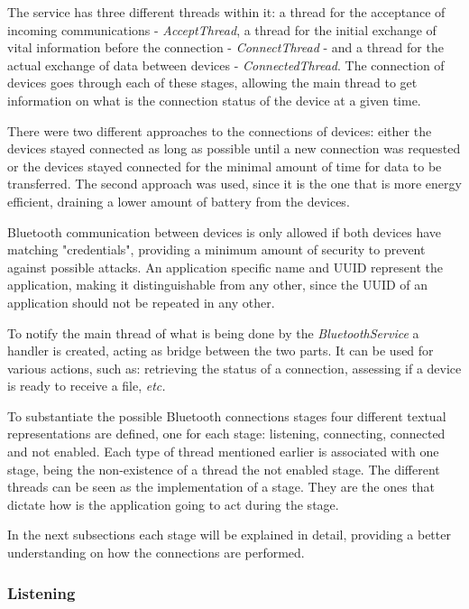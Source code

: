 The service has three different threads within it: a thread for the acceptance of incoming communications - \textit{AcceptThread}, a thread for the initial exchange of vital information before the connection - \textit{ConnectThread} - and a thread for the actual exchange of data between devices - \textit{ConnectedThread}. The connection of devices goes through each of these stages, allowing the main thread to get information on what is the connection status of the device at a given time.

There were two different approaches to the connections of devices: either the devices stayed connected as long as possible until a new connection was requested or the devices stayed connected for the minimal amount of time for data to be transferred. The second approach was used, since it is the one that is more energy efficient, draining a lower amount of battery from the devices.

Bluetooth communication between devices is only allowed if both devices have matching "credentials", providing a minimum amount of security to prevent against possible attacks. An application specific name and \gls{UUID} represent the application, making it distinguishable from any other, since the \gls{UUID} of an application should not be repeated in any other.

To notify the main thread of what is being done by the \textit{BluetoothService} a handler is created, acting as bridge between the two parts. It can be used for various actions, such as: retrieving the status of a connection, assessing if a device is ready to receive a file, \textit{etc.}

To substantiate the possible Bluetooth connections stages four different textual representations are defined, one for each stage: listening, connecting, connected and not enabled. Each type of thread mentioned earlier is associated with one stage, being the non-existence of a thread the not enabled stage. The different threads can be seen as the implementation of a stage. They are the ones that dictate how is the application going to act during the stage. 

In the next subsections each stage will be explained in detail, providing a better understanding on how the connections are performed.

\subsubsection{Listening}
\label{subsubsec:listening}

